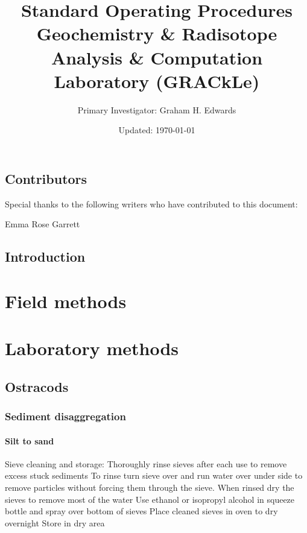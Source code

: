 \documentclass[letterpaper, 12pt, openany]{book}
\title{Standard Operating Procedures\\ \large Geochemistry \& Radisotope Analysis \& Computation Laboratory (GRACkLe)}
\author{Primary Investigator: Graham H. Edwards}
\date{Updated: \today{}}
\begin{document}
\frontmatter 
\maketitle

\chapter{Contributors}
Special thanks to the following writers who have contributed to this document:

\begin{center}

    Emma Rose Garrett


    
\end{center}

\chapter{Introduction}



\mainmatter
\part{Field methods}

\part{Laboratory methods}

\chapter{Ostracods}

\section{Sediment disaggregation}

\subsection{Silt to sand}

Sieve cleaning and storage: 
Thoroughly rinse sieves after each use to remove excess stuck sediments 
To rinse turn sieve over and run water over under side to remove particles without forcing them through the sieve.
When rinsed dry the sieves to remove most of the water 
Use ethanol or isopropyl alcohol in squeeze bottle and spray over bottom of sieves 
Place cleaned sieves in oven to dry overnight 
Store in dry area 
\end{document}
